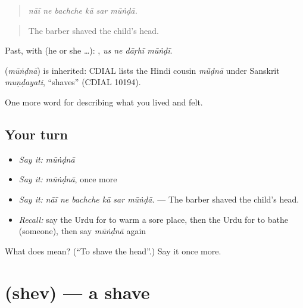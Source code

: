 \begin{quote}
     
\end{quote}

\begin{quote}
\emph{nāī ne bachche kā sar mūṅḍā.}
\end{quote}

\begin{quote}
The barber shaved the child's head.
\end{quote}

Past, with  (he or she …):    , \emph{us ne dāṛhī mūṅḍī}.

\begin{cousinweb}
\textbf{} (\emph{mūṅḍnā}) is inherited: CDIAL lists the Hindi cousin \emph{mū̃ḍnā} under Sanskrit \emph{muṇḍayati}, \textquotedblleft{}shaves\textquotedblright{} (CDIAL 10194).
\end{cousinweb}

\begin{grammarlens}[title={What you've built}]
One more word for describing what you lived and felt.
\end{grammarlens}

\subsection*{Your turn}
\begin{itemize}
\raggedright
  \item \emph{Say it:} \emph{mūṅḍnā}
  \item \emph{Say it:} \emph{mūṅḍnā}, once more
  \item \emph{Say it:} \emph{nāī ne bachche kā sar mūṅḍā.} — The barber shaved the child's head.
  \item \emph{Recall:} say the Urdu for to warm a sore place, then the Urdu for to bathe (someone), then say \emph{mūṅḍnā} again
\end{itemize}

\begin{tcolorbox}[breakable,colback=teal!4,colframe=teal!35!black,title={Before you move on}]
What does  mean? (\textquotedblleft{}To shave the head\textquotedblright{}.) Say it once more.
\end{tcolorbox}
\section[\texorpdfstring{\ur{شیو} (shev)}{شیو (shev)}]{ (shev) — a shave}

